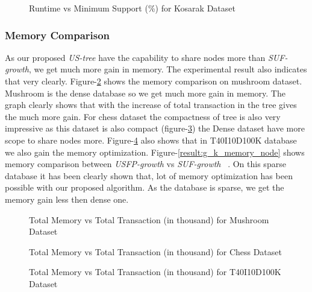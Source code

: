 \documentclass[conference]{IEEEtran}
\begin{document}
            \begin{figure}[h]
            \centering
                
            \caption{Runtime vs Minimum Support (\%) for Kosarak Dataset }
            \label{result:g_k_total}
            \end{figure}
            
\subsubsection{Memory Comparison}
As our proposed \emph{US-tree} have the capability to share nodes more than \emph{SUF-growth}, we get much more gain in memory. The experimental result also indicates that very clearly. Figure-\ref{result:g_m_memory_node} shows the memory comparison on mushroom dataset. Mushroom is the dense database so we get  much more gain in memory. The graph clearly shows that with the increase of total transaction in the tree gives the much more gain. For chess dataset the compactness of tree is also very impressive as this dataset is also compact (figure-\ref{result:g_chess_memory_node}) the Dense dataset have more scope to share nodes more. Figure-\ref{result:g_t10_memory_node} also shows that in T40I10D100K database we also gain the memory optimization. Figure-\ref{result:g_k_memory_node} shows memory comparison between \emph{USFP-growth} vs \emph{SUF-growth} ~\cite{suf_growth}. On this sparse database it has been clearly shown that, lot of memory optimization has been possible with our proposed algorithm. As the database is sparse, we get the memory gain less then dense one.
            \begin{figure}[h]
            \centering
                
            \caption{Total Memory vs Total Transaction (in thousand) for Mushroom Dataset }
            \label{result:g_m_memory_node}
            \end{figure}
            
            \begin{figure}[h]
            \centering
                
            \caption{Total Memory vs Total Transaction (in thousand) for Chess Dataset }
            \label{result:g_chess_memory_node}
            \end{figure}
            
            \begin{figure}[h]
                
            \caption{Total Memory vs Total Transaction (in thousand) for T40I10D100K Dataset }
            \label{result:g_t10_memory_node}
            \end{figure}
        
\end{document}
